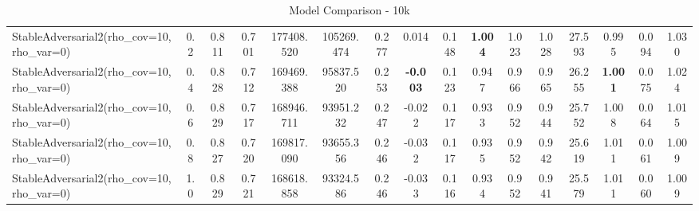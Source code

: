 \documentclass[11pt]{article}
\theoremstyle{plain}
\theoremstyle{definition}
\newcommand{\1}{\mathbf{1}}
\begin{document}
\begin{table}[h]
{\begin{tabular}{lccccccccccccccc}
StableAdversarial2(rho\_cov=10, rho\_var=0) & 0.2 & 0.811 & 0.701 & 177408.520 & 105269.474 & 0.277 & 0.014 & 0.148 & \textbf{1.004} & 1.023 & 1.028 & 27.593 & 0.995 & 0.094 & 1.030 \\
StableAdversarial2(rho\_cov=10, rho\_var=0) & 0.4 & 0.828 & 0.712 & 169469.388 & 95837.520 & 0.253 & \textbf{-0.003} & 0.123 & 0.947 & 0.966 & 0.965 & 26.255 & \textbf{1.001} & 0.075 & 1.024 \\
StableAdversarial2(rho\_cov=10, rho\_var=0) & 0.6 & 0.829 & 0.717 & 168946.711 & 93951.232 & 0.247 & -0.022 & 0.117 & 0.933 & 0.952 & 0.944 & 25.752 & 1.008 & 0.064 & 1.015 \\
StableAdversarial2(rho\_cov=10, rho\_var=0) & 0.8 & 0.827 & 0.720 & 169817.090 & 93655.356 & 0.246 & -0.032 & 0.117 & 0.935 & 0.952 & 0.942 & 25.619 & 1.011 & 0.061 & 1.009 \\
StableAdversarial2(rho\_cov=10, rho\_var=0) & 1.0 & 0.829 & 0.721 & 168618.858 & 93324.586 & 0.246 & -0.033 & 0.116 & 0.934 & 0.952 & 0.941 & 25.579 & 1.011 & 0.060 & 1.009 \\
\bottomrule
\end{tabular}%
}
\caption{Model Comparison - 10k}
\end{table}
\end{document}
